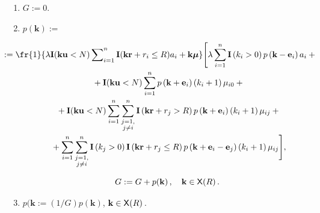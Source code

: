   \begin{enumerate}[1.]


  \item $G:= 0$.


  \item $  p(\mathbf{k}):=$


  \begin{multline}


\hspace*{-8mm}:= \fr{1}{\lambda \mathbf{I} (\mathbf{ku} <N) 


\sum\nolimits^n_{i=1} \mathbf{I}(\mathbf{kr}+r_i\leq R) a_i 


+\mathbf{k}{\boldsymbol{\mu}}}\Bigg[


 \lambda \sum\limits^n_{i=1} 


\mathbf{I}\left( k_i>0\right) p\left( \mathbf{k}-\mathbf{e}_i\right) a_i+{}\hspace*{-3.89pt}\\


  {}+ \mathbf{I} (\mathbf{ku}<N) \sum\limits^n_{i=1} p\left( 


\mathbf{k}+\mathbf{e}_i\right) \left( k_i+1\right) \mu_{i0}+{}\\


  {}+ \mathbf{I} (\mathbf{ku}<N) \sum\limits^n_{i=1} 


  \sum\limits^n_{\substack{{j=1,}\\ {j\not= i}}} \mathbf{I}\left( \mathbf{kr}+r_j>R\right) p\left( \mathbf{k}+\mathbf{e}_i\right) 


\left( k_i+1\right) \mu_{ij}+{}\\


   {}+ \sum\limits^n_{i=1} 


  \sum\limits^n_{\substack{{j=1,}\\ {j\not=i}}} \mathbf{I} \left( 


k_j>0\right) \mathbf{I} \left( \mathbf{kr}+r_j\leq R\right) p\left( 


\mathbf{k}+\mathbf{e}_i -\mathbf{e}_j\right) \left( k_i+1\right) \mu_{ij} 


\Bigg],


  \label{e2-bs}


  \end{multline}


  $$


  G:= G+p(\mathbf{k})\,,\quad \mathbf{k}\in {\sf X}(R)\,.


  $$


  \item $p(\mathbf{k}:=(1/G)p(\mathbf{k})$, $\mathbf{k}\in {\sf X}(R)$\,.


  \end{enumerate}


